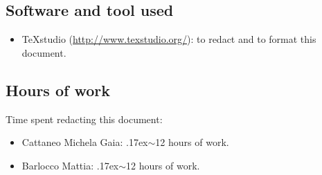 \documentclass[18pt,oneside,a4paper, titlepage]{article}
\begin{document}
	\subsection{Software and tool used}
		\begin{itemize}
			\item TeXstudio (\url{http://www.texstudio.org/}): to redact and to format this document.
		\end{itemize}
	
	\subsection{Hours of work}
		Time spent redacting this document:
		\begin{itemize}
			\item Cattaneo Michela Gaia: {\raise.17ex\hbox{$\scriptstyle\sim$}}12 hours of work.
			\item Barlocco Mattia: {\raise.17ex\hbox{$\scriptstyle\sim$}}12 hours of work.
		\end{itemize}
\end{document}
